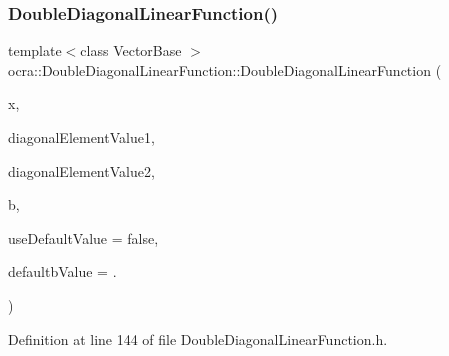 \subsubsection{\texorpdfstring{Double\+Diagonal\+Linear\+Function()}{DoubleDiagonalLinearFunction()}\hspace{0.1cm}{\footnotesize\ttfamily [2/4]}}
{\footnotesize\ttfamily template$<$class Vector\+Base $>$ \\
ocra\+::\+Double\+Diagonal\+Linear\+Function\+::\+Double\+Diagonal\+Linear\+Function (\begin{DoxyParamCaption}\item[{\hyperlink{classocra_1_1Variable}{Variable} \&}]{x,  }\item[{const double}]{diagonal\+Element\+Value1,  }\item[{const double}]{diagonal\+Element\+Value2,  }\item[{const Vector\+Base \&}]{b,  }\item[{const bool}]{use\+Default\+Value = {\ttfamily false},  }\item[{const double}]{defaultb\+Value = {.} }\end{DoxyParamCaption})\hspace{0.3cm}{\ttfamily [inline]}}



Definition at line 144 of file Double\+Diagonal\+Linear\+Function.\+h.

\hypertarget{classocra_1_1DoubleDiagonalLinearFunction_a7403903ccd31cec18bf665aefd1f4900}{}\label{classocra_1_1DoubleDiagonalLinearFunction_a7403903ccd31cec18bf665aefd1f4900} 
